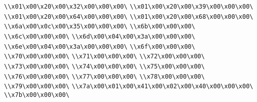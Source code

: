 \verb|\\x01\x00\x20\x00\x32\x00\x00\x00\|\newline
\verb|\\x01\x00\x20\x00\x39\x00\x00\x00\|\newline
\verb|\\x01\x00\x20\x00\x64\x00\x00\x00\|\newline
\verb|\\x01\x00\x20\x00\x68\x00\x00\x00\|\newline
\verb|\\x6a\x00\x0c\x00\x35\x00\x00\x00\|\newline
\verb|\\x6b\x00\x00\x00\|\newline
\verb|\\x6c\x00\x00\x00\|\newline
\verb|\\x6d\x00\x04\x00\x3a\x00\x00\x00\|\newline
\verb|\\x6e\x00\x04\x00\x3a\x00\x00\x00\|\newline
\verb|\\x6f\x00\x00\x00\|\newline
\verb|\\x70\x00\x00\x00\|\newline
\verb|\\x71\x00\x00\x00\|\newline
\verb|\\x72\x00\x00\x00\|\newline
\verb|\\x73\x00\x00\x00\|\newline
\verb|\\x74\x00\x00\x00\|\newline
\verb|\\x75\x00\x00\x00\|\newline
\verb|\\x76\x00\x00\x00\|\newline
\verb|\\x77\x00\x00\x00\|\newline
\verb|\\x78\x00\x00\x00\|\newline
\verb|\\x79\x00\x00\x00\|\newline
\verb|\\x7a\x00\x01\x00\x41\x00\x02\x00\x40\x00\x00\x00\|\newline
\verb|\\x7b\x00\x00\x00\|\newline
